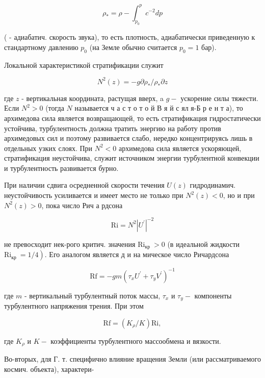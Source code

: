 \documentclass[10pt]{article}
\begin{document}
\[

\rho_{*}=\rho-\int_{p_{0}}^{p} c^{-2} d p

\]



( - адиабатич. скорость звука), то есть плотность, адиабатически приведенную к стандартному давлению $p_{0}$ (на Земле обычно считается $p_{0}=1$ бар).



Локальной характеристикой стратификации служит



\[

N^{2}(z)=-g \partial \rho_{*} / \rho_{*} \partial z

\]



где $z$ - вертикальная координата, растущая вверх, a $g-$ ускорение силы тяжести. Если $N^{2}>0$ (тогда $N$ называется ч а с т о т о й В я й с ял я-Б р е н т а), то архимедова сила является возвращающей, то есть стратификация гидростатически устойчива, турбулентность должна тратить энергию на работу против архимедовых сил и поэтому развивается слабо, нередко концентрируясь лишь в отдельных узких слоях. При $N^{2}<0$ архимедова сила является ускоряющей, стратификация неустойчива, служит источником энергии турбулентной конвекции и турбулентность развивается бурно.



При наличии сдвига осредненной скорости течения $U(z)$ гидродинамич. неустойчивость усиливается и имеет место не только при $N^{2}(z)<0$, но и при $N^{2}(z)>0$, пока число Рич а рдсона



\[

\mathrm{Ri}=N^{2}\left|U^{\prime}\right|^{-2}

\]



не превосходит нек-рого критич. значения $\mathrm{Ri}_{\text {кр }}>0$ (в идеальной жидкости $\left.\mathrm{Ri}_{\text {кр }}=1 / 4\right)$. Его аналогом является д и на мическое число Ричардсона



\[

\mathrm{Rf}=-g m\left(\tau_{x} U^{\prime}+\tau_{y} V^{\prime}\right)^{-1}

\]



где $m$ - вертикальный турбулентный поток массы, $\tau_{x}$ и $\tau_{y}-$ компоненты турбулентного напряжения трения. При этом



\[

\mathrm{Rf}=\left(K_{\rho} / K\right) \mathrm{Ri},

\]



где $K_{\rho}$ и $K-$ коэффициенты турбулентного массообмена и вязкости.



Во-вторых, для Г. т. специфично влияние вращения Земли (или рассматриваемого космич. объекта), характери-
\end{document}

